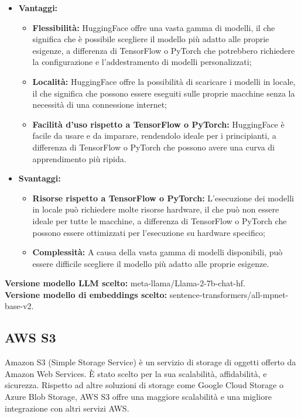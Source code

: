 \documentclass[10pt, a4paper]{article}
\begin{document}
\begin{itemize}
\item \textbf{Vantaggi:}
\begin{itemize}
\item \textbf{Flessibilità:} HuggingFace offre una vasta gamma di modelli, il che significa che è possibile scegliere il modello più adatto alle proprie esigenze, a differenza di TensorFlow o PyTorch che potrebbero richiedere la configurazione e l'addestramento di modelli personalizzati;
\item \textbf{Località:} HuggingFace offre la possibilità di scaricare i modelli in locale, il che significa che possono essere eseguiti sulle proprie macchine senza la necessità di una connessione internet;
\item \textbf{Facilità d'uso rispetto a TensorFlow o PyTorch:} HuggingFace è facile da usare e da imparare, rendendolo ideale per i principianti, a differenza di TensorFlow o PyTorch che possono avere una curva di apprendimento più ripida.
\end{itemize}
\item \textbf{Svantaggi:}
\begin{itemize}
\item \textbf{Risorse rispetto a TensorFlow o PyTorch:} L'esecuzione dei modelli in locale può richiedere molte risorse hardware, il che può non essere ideale per tutte le macchine, a differenza di TensorFlow o PyTorch che possono essere ottimizzati per l'esecuzione su hardware specifico;
\item \textbf{Complessità:} A causa della vasta gamma di modelli disponibili, può essere difficile scegliere il modello più adatto alle proprie esigenze.
\end{itemize}
\end{itemize}
\textbf{Versione modello LLM scelto:} meta-llama/Llama-2-7b-chat-hf. \\
\textbf{Versione modello di embeddings scelto:} sentence-transformers/all-mpnet-base-v2.

\subsection{AWS S3}
Amazon S3 (Simple Storage Service) è un servizio di storage di oggetti offerto da Amazon Web Services. È stato scelto per la sua scalabilità, affidabilità, e sicurezza. Rispetto ad altre soluzioni di storage come Google Cloud Storage o Azure Blob Storage, AWS S3 offre una maggiore scalabilità e una migliore integrazione con altri servizi AWS.
\end{document}
